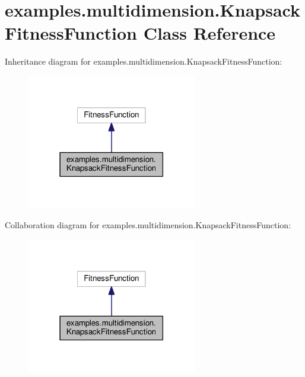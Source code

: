 \hypertarget{classexamples_1_1multidimension_1_1_knapsack_fitness_function}{\section{examples.\-multidimension.\-Knapsack\-Fitness\-Function Class Reference}
\label{classexamples_1_1multidimension_1_1_knapsack_fitness_function}
}


Inheritance diagram for examples.\-multidimension.\-Knapsack\-Fitness\-Function\-:
\nopagebreak
\begin{figure}[H]
\begin{center}
\leavevmode
\includegraphics[width=210pt]{classexamples_1_1multidimension_1_1_knapsack_fitness_function__inherit__graph}
\end{center}
\end{figure}


Collaboration diagram for examples.\-multidimension.\-Knapsack\-Fitness\-Function\-:
\nopagebreak
\begin{figure}[H]
\begin{center}
\leavevmode
\includegraphics[width=210pt]{classexamples_1_1multidimension_1_1_knapsack_fitness_function__coll__graph}
\end{center}
\end{figure}
